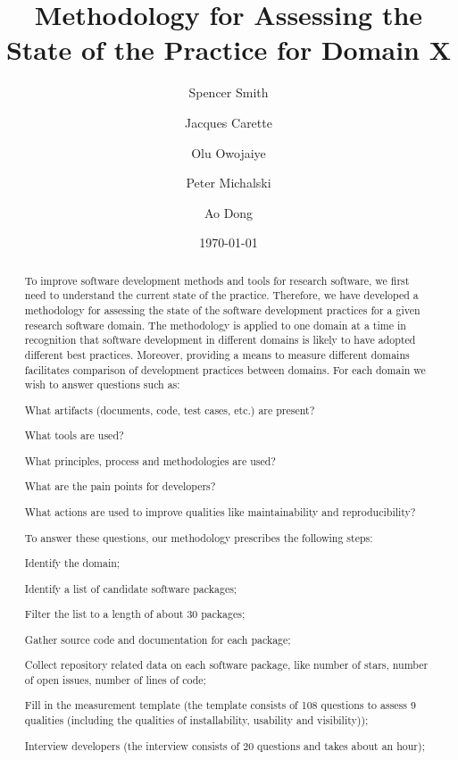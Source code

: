\documentclass[letterpaper,cleveref]{lipics-v2019}
\title{Methodology for Assessing the State of the Practice for Domain X}
\author{Spencer Smith}{McMaster University, Canada}{smiths@mcmaster.ca}{}{}
\author{Jacques Carette}{McMaster University, Canada}{carette@mcmaster.ca}{}{}
\author{Olu Owojaiye}{McMaster University, Canada}{owojaiyo@mcmaster.ca}{}{}
\author{Peter Michalski}{McMaster University, Canada}{michap@mcmaster.ca}{}{}
\author{Ao Dong}{McMaster University, Canada}{donga9@mcmaster.ca}{}{}
\date{\today}
\begin{document}
\maketitle

\begin{abstract}
	To improve software development methods and tools for research software, we
	first need to understand the current state of the practice.  Therefore, we
	have developed a methodology for assessing the state of the software
	development practices for a given research software domain.  The methodology
	is applied to one domain at a time in recognition that software development in
	different domains is likely to have adopted different best practices.
	Moreover, providing a means to measure different domains facilitates
	comparison of development practices between domains.  For each domain we wish
	to answer questions such as: 
  \begin{inparaenum}[i)]
    \item What artifacts (documents, code, test cases, etc.) are present?
    \item What tools are used?
    \item What principles, process and methodologies are used?
    \item What are the pain points for developers?
    \item What actions are used to improve qualities like maintainability and
    reproducibility?
  \end{inparaenum} 
  To answer these questions, our methodology prescribes the following steps: 
  \begin{inparaenum}[i)] 
    \item Identify the domain;
    \item Identify a list of candidate software packages;
    \item Filter the list to a length of about 30 packages;
    \item Gather source code and documentation for each package;
    \item Collect repository related data on each software package, like number
    of stars, number of open issues, number of lines of code;
    \item Fill in the measurement template (the template consists of 108
    questions to assess 9 qualities (including the qualities of installability,
    usability and visibility));
    \item Interview developers (the interview consists of 20 questions and takes
    about an hour);

\end{inparaenum}
\end{abstract}
\end{document}
